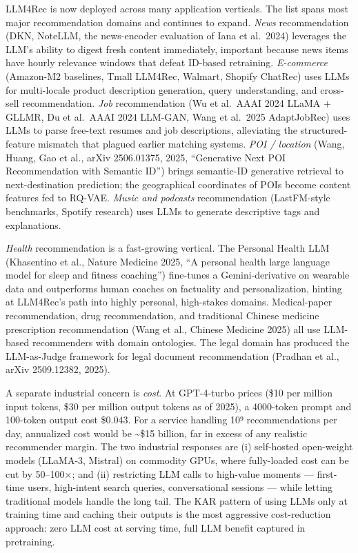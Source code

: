 LLM4Rec is now deployed across many application verticals. The list spans most major recommendation domains and continues to expand. \emph{News} recommendation (DKN, NoteLLM, the news-encoder evaluation of Iana et al.~2024) leverages the LLM's ability to digest fresh content immediately, important because news items have hourly relevance windows that defeat ID-based retraining. \emph{E-commerce} (Amazon-M2 baselines, Tmall LLM4Rec, Walmart, Shopify ChatRec) uses LLMs for multi-locale product description generation, query understanding, and cross-sell recommendation. \emph{Job} recommendation (Wu et al.~AAAI 2024 LLaMA + GLLMR, Du et al.~AAAI 2024 LLM-GAN, Wang et al.~2025 AdaptJobRec) uses LLMs to parse free-text resumes and job descriptions, alleviating the structured-feature mismatch that plagued earlier matching systems. \emph{POI / location} (Wang, Huang, Gao et al., arXiv 2506.01375, 2025, ``Generative Next POI Recommendation with Semantic ID'') brings semantic-ID generative retrieval to next-destination prediction; the geographical coordinates of POIs become content features fed to RQ-VAE. \emph{Music and podcasts} recommendation (LastFM-style benchmarks, Spotify research) uses LLMs to generate descriptive tags and explanations.

\emph{Health} recommendation is a fast-growing vertical. The Personal Health LLM (Khasentino et al., Nature Medicine 2025, ``A personal health large language model for sleep and fitness coaching'') fine-tunes a Gemini-derivative on wearable data and outperforms human coaches on factuality and personalization, hinting at LLM4Rec's path into highly personal, high-stakes domains. Medical-paper recommendation, drug recommendation, and traditional Chinese medicine prescription recommendation (Wang et al., Chinese Medicine 2025) all use LLM-based recommenders with domain ontologies. The legal domain has produced the LLM-as-Judge framework for legal document recommendation (Pradhan et al., arXiv 2509.12382, 2025).

A separate industrial concern is \emph{cost}. At GPT-4-turbo prices (\$10 per million input tokens, \$30 per million output tokens as of 2025), a 4000-token prompt and 100-token output cost \$0.043. For a service handling 10⁹ recommendations per day, annualized cost would be \textasciitilde\$15 billion, far in excess of any realistic recommender margin. The two industrial responses are (i) self-hosted open-weight models (LLaMA-3, Mistral) on commodity GPUs, where fully-loaded cost can be cut by 50--100×; and (ii) restricting LLM calls to high-value moments --- first-time users, high-intent search queries, conversational sessions --- while letting traditional models handle the long tail. The KAR pattern of using LLMs only at training time and caching their outputs is the most aggressive cost-reduction approach: zero LLM cost at serving time, full LLM benefit captured in pretraining.

